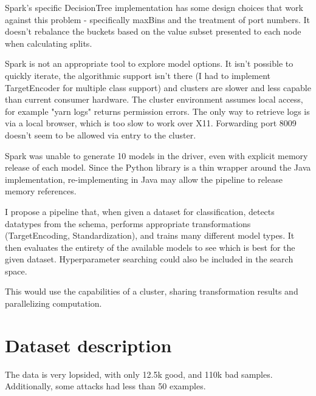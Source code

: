\documentclass[11pt]{article}
\begin{document}
Spark's specific DecisionTree implementation has some design choices
that work against this problem - specifically maxBins and the treatment
of port numbers. It doesn't rebalance the buckets based on the value subset presented to each node when calculating splits.

Spark is not an appropriate tool to explore model options. It isn't possible to quickly iterate, the algorithmic support isn't there (I had to implement TargetEncoder for multiple class support) and clusters are slower and less capable than current consumer hardware. The cluster environment assumes local access, for example "yarn logs" returns permission errors. The only way to retrieve logs is via a local browser, which is too slow to work over X11. Forwarding port 8009 doesn't seem to be allowed via entry to the cluster.

Spark was unable to generate 10 models in the driver, even with explicit memory release of each model. Since the Python library is a thin wrapper around the Java implementation, re-implementing in Java may allow the pipeline to release memory references.

I propose a pipeline that, when given a dataset for classification, detects datatypes from the schema, performs appropriate transformations (TargetEncoding, Standardization), and trains many different model types. It then evaluates the entirety of the available models to see which is best for the given dataset. Hyperparameter searching could also be included in the search space.

This would use the capabilities of a cluster, sharing transformation results and parallelizing computation.

\section{Dataset description}

The data is very lopsided, with only 12.5k good, and 110k bad samples. Additionally, some attacks had less than 50 examples.
\end{document}
